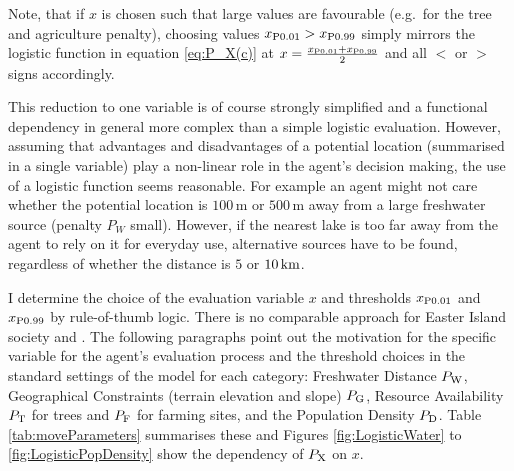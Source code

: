 Note, that if $x$ is chosen such that large values are favourable (e.g.\ for the tree and agriculture penalty), choosing values $x_{\rm P0.01}>x_{\rm P0.99}$ simply mirrors the logistic function in equation \ref{eq:P_X(c)} at $x=\frac{x_{\rm P0.01}+x_{\rm P0.99}}{2}$ and all $<$ or $>$ signs accordingly.


This reduction to one variable is of course strongly simplified and a functional dependency in general more complex than a simple logistic evaluation.
However, assuming that advantages and disadvantages of a potential location (summarised in a single variable) play a non-linear role in the agent's decision making, the use of a logistic function seems reasonable.
For example an agent might not care whether the potential location is $100\, \text{m}$ or $500\, \text{m}$ away from a large freshwater source (penalty $P_W$ small). 
However, if the nearest lake is too far away from the agent to rely on it for everyday use, alternative sources have to be found, regardless of whether the distance is $5$ or $10\, {\rm km}$.

I determine the choice of the evaluation variable $x$ and thresholds $x_{\rm P0.01}$ and $x_{\rm P0.99}$ by rule-of-thumb logic.
There is no comparable approach for Easter Island society and .
The following paragraphs point out the motivation for the specific variable for the agent's evaluation process and the threshold choices in the standard settings of the model for each category: Freshwater Distance $P_{\rm W}$, Geographical Constraints (terrain elevation and slope) $P_{\rm G}$, Resource Availability $P_{\rm T}$ for trees and $P_{\rm F}$ for farming sites, and the Population Density $P_{\rm D}$. 
Table \ref{tab:moveParameters} summarises these and Figures \ref{fig:LogisticWater} to \ref{fig:LogisticPopDensity} show the dependency of $P_{\rm X}$ on $x$.

